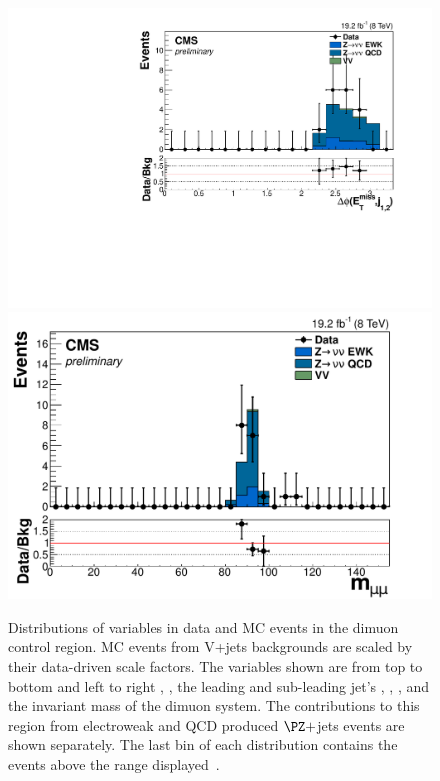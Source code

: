 \begin{figure}
  \includegraphics[width=.65\largefigwidth]{plots/parked/HIG-14-038-figs/output_sigreg/mumu_jetmetnomu_mindphi.pdf}
  \includegraphics[width=.65\largefigwidth]{plots/parked/HIG-14-038-figs/output_sigreg/mumu_m_mumu.pdf}
  \caption{Distributions of variables in data and MC events in the dimuon control region. MC events from V+jets backgrounds are scaled by their data-driven scale factors. The variables shown are from top to bottom and left to right \detajj, \Mjj, the leading and sub-leading jet's \pt, \METnoMU, \METsig, \jetmetdphileading and the invariant mass of the dimuon system. The contributions to this region from electroweak and QCD produced $\PZ+$jets events are shown separately. The last bin of each distribution contains the events above the range displayed~\cite{CMS-PAS-HIG-14-038}.}
  \label{fig:parkedznunu}
\end{figure}

